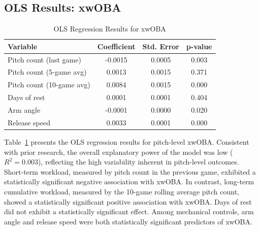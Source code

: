 \documentclass[12pt, letterpaper]{article}
\begin{document}
\subsection{OLS Results: xwOBA}
\begin{table}[htbp]
\centering
\begin{tabular}{lccc}
\hline
Variable & Coefficient & Std. Error & p-value \\
\hline
Pitch count (last game) & -0.0015 & 0.0005 & 0.003 \\
Pitch count (5-game avg) & 0.0013 & 0.0015 & 0.371 \\
Pitch count (10-game avg) & 0.0084 & 0.0015 & 0.000 \\
Days of rest & 0.0001 & 0.0001 & 0.404 \\
Arm angle & -0.0001 & 0.0000 & 0.020 \\
Release speed & 0.0033 & 0.0001 & 0.000 \\
\hline
\end{tabular}
\caption{OLS Regression Results for xwOBA}
\label{tab:xwoba}
\end{table}
Table~\ref{tab:xwoba} presents the OLS regression results for pitch-level xwOBA. 
Consistent with prior research, the overall explanatory power of the model was low ($R^2 = 0.003$), reflecting the high variability inherent in pitch-level outcomes. Short-term workload, measured by pitch count in the previous game, exhibited a statistically significant negative association with xwOBA. In contrast, long-term cumulative workload, measured by the 10-game rolling average pitch count, showed a statistically significant positive association with xwOBA. Days of rest did not exhibit a statistically significant effect. Among mechanical controls, arm angle and release speed were both statistically significant predictors of xwOBA.
\end{document}
